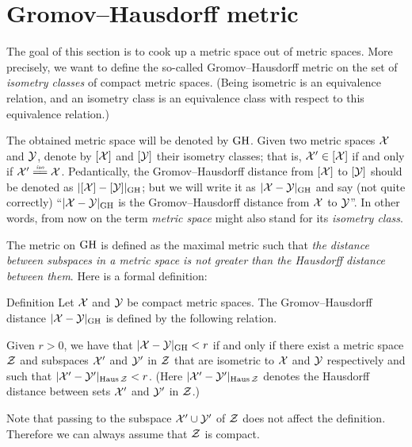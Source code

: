 \section{Gromov--Hausdorff metric}

The goal of this section is to cook up a metric space out of metric spaces.
More precisely, we want to define the so-called  Gromov--Hausdorff metric on the set of {}\emph{isometry classes} of compact metric spaces.
(Being isometric is an equivalence relation, 
and an isometry class is an equivalence class with respect to this equivalence relation.)

The obtained metric space will be denoted by $\operatorname{\rm GH}\nolimits$.
Given two metric spaces $\mathcal{X}$ and $\mathcal{Y}$,
denote by $[\mathcal{X}]$ and $[\mathcal{Y}]$ their isometry classes;
that is, $\mathcal{X}'\in [\mathcal{X}]$ if and only if $\spc{X}'\iso \spc{X}$.
Pedantically, the Gromov--Hausdorff distance from $[\mathcal{X}]$ 
to $[\mathcal{Y}]$ should be denoted as $|[\mathcal{X}]-[\mathcal{Y}]|_{\operatorname{\rm GH}\nolimits}$;
but we will write it as $|\spc{X}\z-\spc{Y}|_{\GH}$ and say (not quite correctly) 
``$|\spc{X}\z-\spc{Y}|_{\GH}$ is the Gromov--Hausdorff distance from  $\mathcal{X}$ 
to  $\mathcal{Y}$''.
In other words, from now on the term {}\emph{metric space} might also stand for its {}\emph{isometry class}.

The metric on $\operatorname{\rm GH}\nolimits$ is defined as the maximal metric such that {}\emph{the distance between subspaces in a metric space is not greater than the Hausdorff distance between them}.
Here is a formal definition:

\begin{thm}{Definition}\label{def:GH}
Let $\mathcal{X}$ and $\mathcal{Y}$ be compact metric spaces. 
The Gromov--Hausdorff distance $|\mathcal{X}-\mathcal{Y}|_{\operatorname{\rm GH}\nolimits}$ is defined by the following
relation.
 
Given  $r > 0$, we have that $|\mathcal{X}-\mathcal{Y}|_{\operatorname{\rm GH}\nolimits} < r$ if and only if there exist a metric
space $\mathcal{Z}$ and subspaces $\mathcal{X}'$ and $\mathcal{Y}'$ in $\mathcal{Z}$ that are isometric to $\mathcal{X}$ and $\mathcal{Y}$
respectively and such that $|\mathcal{X}'-\mathcal{Y}'|_{\operatorname{\rm Haus}\nolimits\mathcal{Z}} < r$. 
(Here $|\mathcal{X}'-\mathcal{Y}'|_{\operatorname{\rm Haus}\nolimits\mathcal{Z}}$ denotes the Hausdorff distance between sets $\mathcal{X}'$ and $\mathcal{Y}'$ in $\mathcal{Z}$.)
\end{thm}

Note that passing to the subspace $\mathcal{X}'\cup\mathcal{Y}'$ of $\mathcal{Z}$ does not affect the definition.
Therefore we can always assume that $\mathcal{Z}$ is compact.

